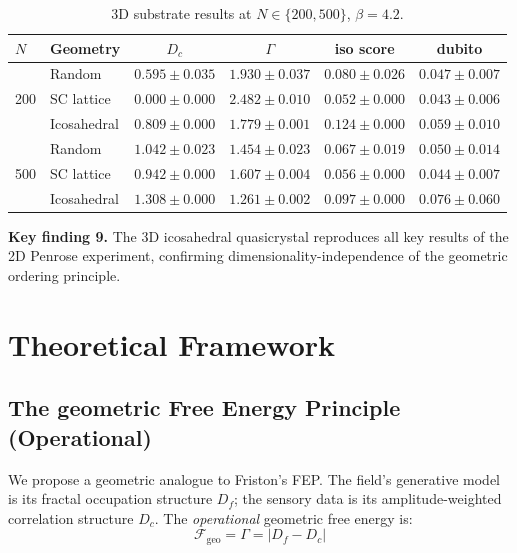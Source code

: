\documentclass[12pt,a4paper]{article}
\theoremstyle{plain}
\theoremstyle{definition}
\newcommand{\Fc}{\mathcal{F}}
\begin{document}
\small
\begin{table}[H]
\centering
\caption{3D substrate results at $N \in \{200, 500\}$, $\beta = 4.2$.}
\label{tab:3d_results}
\begin{tabular}{llcccc}
\toprule
$N$ & Geometry & $D_c$ & $\Gamma$ & iso score & dubito \\
\midrule
\multirow{3}{*}{200} &
  Random      & $0.595 \pm 0.035$ & $1.930 \pm 0.037$ &
  $0.080 \pm 0.026$ & $0.047 \pm 0.007$ \\
& SC lattice  & $0.000 \pm 0.000$ & $2.482 \pm 0.010$ &
  $0.052 \pm 0.000$ & $0.043 \pm 0.006$ \\
& Icosahedral & $0.809 \pm 0.000$ & $1.779 \pm 0.001$ &
  $\mathbf{0.124 \pm 0.000}$ & $0.059 \pm 0.010$ \\
\midrule
\multirow{3}{*}{500} &
  Random      & $1.042 \pm 0.023$ & $1.454 \pm 0.023$ &
  $0.067 \pm 0.019$ & $0.050 \pm 0.014$ \\
& SC lattice  & $0.942 \pm 0.000$ & $1.607 \pm 0.004$ &
  $0.056 \pm 0.000$ & $0.044 \pm 0.007$ \\
& Icosahedral & $1.308 \pm 0.000$ & $\mathbf{1.261 \pm 0.002}$ &
  $\mathbf{0.097 \pm 0.000}$ & $0.076 \pm 0.060$ \\
\bottomrule
\end{tabular}
\end{table}
\normalsize

\begin{keyresult}
\textbf{Key finding 9.} The 3D icosahedral quasicrystal reproduces all
key results of the 2D Penrose experiment, confirming
dimensionality-independence of the geometric ordering principle.
\end{keyresult}

\section{Theoretical Framework}
\label{sec:theory}

\subsection{The geometric Free Energy Principle (Operational)}

We propose a geometric analogue to Friston's FEP. The field's generative
model is its fractal occupation structure $D_f$; the sensory data is its
amplitude-weighted correlation structure $D_c$. The \emph{operational}
geometric free energy is:
\begin{equation}
\Fc_{\text{geo}} = \Gamma = |D_f - D_c|
\end{equation}
\end{document}

